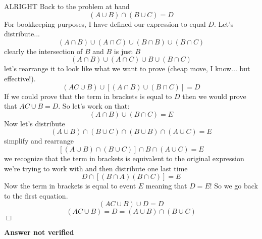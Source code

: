 ALRIGHT  Back to the problem at hand
\begin{equation}
	(A \cup B) \cap (B \cup C)=D
\end{equation}
For bookkeeping purposes, I have defined our expression to equal $D$.  Let's distribute...
\begin{equation}
	(A \cap B) \cup (A \cap C)\cup (B \cap B)\cup (B \cap C)
\end{equation}
clearly the intersection of $B$ and $B$ is just $B$
\begin{equation}
	(A \cap B) \cup (A \cap C)\cup B \cup (B \cap C)
\end{equation}
let's rearrange it to look like what we want to prove (cheap move, I know... but effective!).
\begin{equation}
	(AC\cup B) \cup \left[(A \cap B) \cup (B \cap C)\right]=D
\end{equation}
If we could prove that the term in brackets is equal to $D$ then we would prove that $AC\cup B=D$.  So let's work on that:
\begin{equation}
	(A \cap B) \cup (B \cap C) = E
\end{equation}
Now let's distribute
\begin{equation}
	(A \cup B) \cap (B \cup C) \cap (B \cup B)\cap (A \cup C) = E
\end{equation}
simplify and rearrange
\begin{equation}
	\left[(A \cup B) \cap (B \cup C)\right] \cap B\cap (A \cup C) = E
\end{equation}
we recognize that the term in brackets is equivalent to the original expression we're trying to work with and then distribute one last time
\begin{equation}
	D \cap \left[(B \cap A) (B \cap C)\right] = E
\end{equation}
Now the term in brackets is equal to event $E$ meaning that $D=E$!  So we go back to the first equation.
\begin{equation}
	(AC\cup B) \cup D = D
\end{equation}
\begin{equation}
	(AC\cup B) = D = (A \cup B) \cap (B \cup C)
\end{equation}
$\Box$

\textbf{Answer not verified}

